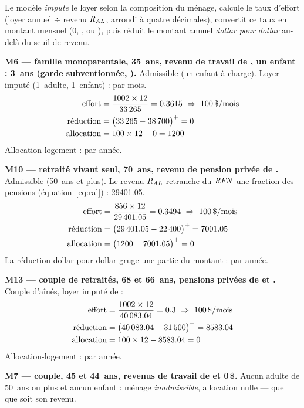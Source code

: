 \pexemples Le modèle \emph{impute} le loyer selon la composition du ménage, calcule
le taux d'effort (loyer annuel $\div$ revenu $\mathit{R_{AL}}$, arrondi à quatre
décimales), convertit ce taux en montant mensuel (0, ,
 ou ), puis réduit le montant annuel
\emph{dollar pour dollar} au-delà du seuil de revenu.

\medskip\noindent\textbf{M6 --- famille monoparentale, 35~ans, revenu de travail de , un enfant : 3~ans (garde subventionnée, ).}
Admissible (un enfant à charge). Loyer imputé (1~adulte, 1~enfant) :
 par mois.
\begin{align*}
\text{effort} &= \frac{\num{1002} \times 12}{\num{33265}} = 0.3615 \ \Rightarrow\ \num{100}\,\$/\text{mois} \\
\text{réduction} &= \pos{\num{33265} - \num{38700}} = \num{0} \\
\text{allocation} &= \num{100} \times 12 - \num{0} = \num{1200}
\end{align*}
Allocation-logement :  par année.

\medskip\noindent\textbf{M10 --- retraité vivant seul, 70~ans, revenu de pension privée de .}
Admissible (50~ans et plus). Le revenu $\mathit{R_{AL}}$ retranche du $\mathit{RFN}$
une fraction des pensions (équation~\eqref{eq:ral}) : \num{29401.05}.
\begin{align*}
\text{effort} &= \frac{\num{856} \times 12}{\num{29401.05}} = 0.3494 \ \Rightarrow\ \num{100}\,\$/\text{mois} \\
\text{réduction} &= \bigl(\num{29401.05} - \num{22400}\bigr)^{+} = \num{7001.05} \\
\text{allocation} &= \bigl(\num{1200} - \num{7001.05}\bigr)^{+} = \num{0}
\end{align*}
La réduction dollar pour dollar gruge une partie du montant :
 par année.

\medskip\noindent\textbf{M13 --- couple de retraités, 68 et 66~ans, pensions privées de  et .}
Couple d'aînés, loyer imputé de  :
\begin{align*}
\text{effort} &= \frac{\num{1002} \times 12}{\num{40083.04}} = 0.3 \ \Rightarrow\ \num{100}\,\$/\text{mois} \\
\text{réduction} &= \pos{\num{40083.04} - \num{31500}} = \num{8583.04} \\
\text{allocation} &= \num{100} \times 12 - \num{8583.04} = \num{0}
\end{align*}
Allocation-logement :  par année.

\medskip\noindent\textbf{M7 --- couple, 45 et 44~ans, revenus de travail de  et 0\,\$.}
Aucun adulte de 50~ans ou plus et aucun enfant : ménage
\emph{inadmissible}, allocation nulle — quel que soit son revenu.
